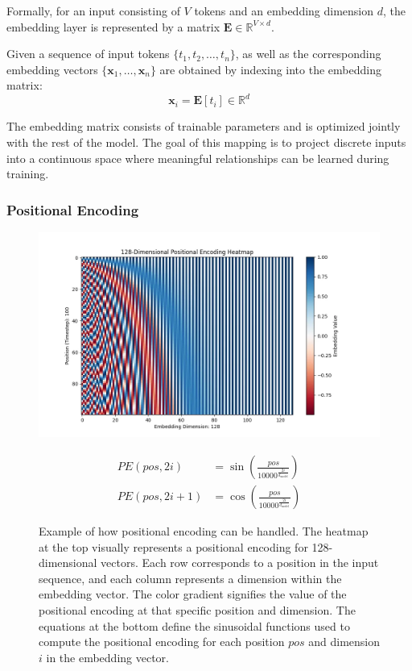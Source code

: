 \documentclass{pracalicmgr}
\begin{document}
Formally, for an input consisting of \( V \) tokens and an embedding dimension \( d \), the embedding layer is represented by a matrix \( \mathbf{E} \in \mathbb{R}^{V \times d} \).

Given a sequence of input tokens \( \{t_1, t_2, \ldots, t_n\} \), as well as the corresponding embedding vectors \( \{\mathbf{x}_1, \ldots, \mathbf{x}_n\} \) are obtained by indexing into the embedding matrix:
\[
\mathbf{x}_i = \mathbf{E}[t_i] \in \mathbb{R}^d
\]

The embedding matrix consists of trainable parameters and is optimized jointly with the rest of the model. The goal of this mapping is to project discrete inputs into a continuous space where meaningful relationships can be learned during training.

\subsubsection{Positional Encoding}

\begin{figure}[H]
    \centering
    \begin{minipage}{0.8\textwidth}
        \centering
        \includegraphics[width=\textwidth]{src/embedings.png}
    \end{minipage}
    \vspace{0.2cm}
    \begin{minipage}{0.7\textwidth}
        \centering
        \begin{align*}
        PE(pos, 2i) &= \sin\left(\frac{pos}{10000^{\frac{2i}{d_{\text{model}}}}}\right) \\
        PE(pos, 2i + 1) &= \cos\left(\frac{pos}{10000^{\frac{2i}{d_{\text{model}}}}}\right)
        \end{align*}
    \end{minipage}
    \caption{Example of how positional encoding can be handled. The heatmap at the top visually represents a positional encoding for 128-dimensional vectors. Each row corresponds to a position in the input sequence, and each column represents a dimension within the embedding vector. The color gradient signifies the value of the positional encoding at that specific position and dimension. The equations at the bottom define the sinusoidal functions used to compute the positional encoding for each position \( pos \) and dimension \( i \) in the embedding vector.\cite{Kubo2024Transformer}}
    \label{fig:positionalEncoding}
\end{figure}
\end{document}
